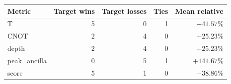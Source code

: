 \begin{tabular}{lrrrr}
\toprule
Metric & Target wins & Target losses & Ties & Mean relative \\
\midrule
T & 5 & 0 & 1 & $-41.57\%$ \\
CNOT & 2 & 4 & 0 & $+25.23\%$ \\
depth & 2 & 4 & 0 & $+25.23\%$ \\
peak_ancilla & 0 & 5 & 1 & $+141.67\%$ \\
score & 5 & 1 & 0 & $-38.86\%$ \\
\bottomrule
\end{tabular}
